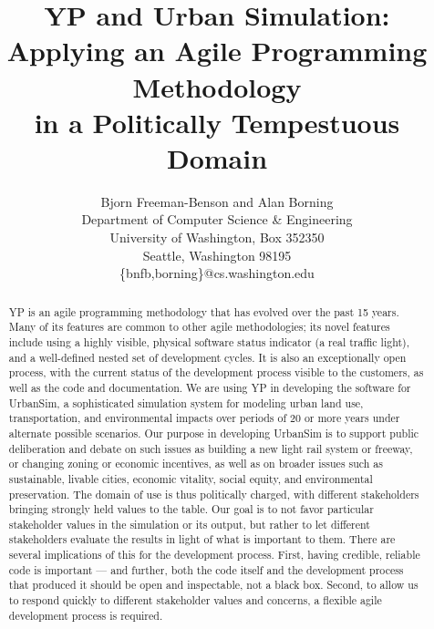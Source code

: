 \documentclass[times, 10pt,twocolumn]{article}
\begin{document}
\title{YP and Urban Simulation: Applying an Agile Programming Methodology \\
in a Politically Tempestuous Domain}

\author{Bjorn Freeman-Benson and Alan Borning \\
Department of Computer Science \& Engineering \\
University of Washington, Box 352350 \\
Seattle, Washington 98195 \\
\{bnfb,borning\}@cs.washington.edu}

\maketitle
\thispagestyle{empty}

\begin{abstract}
YP is an agile programming methodology that has evolved over the past 15 years.
Many of its features are common to other agile methodologies; its novel
features include using a highly visible, physical software status indicator
(a real traffic light), and a well-defined nested set of development
cycles.  It is also an exceptionally open process, with the current status
of the development process visible to the customers, as well as the code
and documentation.  We are using YP in developing the software for
UrbanSim, a sophisticated simulation system for modeling urban land use,
transportation, and environmental impacts over periods of 20 or more years
under alternate possible scenarios.  Our purpose in developing UrbanSim is
to support public deliberation and debate on such issues as building a new
light rail system or freeway, or changing zoning or economic incentives, as
well as on broader issues such as sustainable, livable cities, economic
vitality, social equity, and environmental preservation.  The domain of use
is thus politically charged, with different stakeholders bringing strongly
held values to the table.  Our goal is to not favor particular stakeholder
values in the simulation or its output, but rather to let different
stakeholders evaluate the results in light of what is important to them.
There are several implications of this for the development process.  First,
having credible, reliable code is important --- and further, both the code
itself and the development process that produced it should be open and
inspectable, not a black box.  Second, to allow us to respond quickly to
different stakeholder values and concerns, a flexible agile development
process is required.
\end{abstract}
\end{document}
